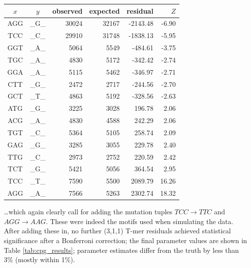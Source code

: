 \documentclass{article}
\newcommand{\nA}{\mbox{A}}  %
\newcommand{\nC}{\mbox{C}}
\newcommand{\nG}{\mbox{G}}
\newcommand{\nT}{\mbox{T}}
\theoremstyle{plain}
\theoremstyle{definition}
\begin{document}
    \begin{center}
        \begin{tabular}{ccrrrr}
            \hline
                $x$ & $y$ & observed &   expected &    residual &  $Z$ \\
                \hline
                \nA\nG\nG  &  \_\nG\_  &  30024  &  32167  &  -2143.48  &  -6.90 \\
                \nT\nC\nC  &  \_\nC\_  &  29910  &  31748  &  -1838.13  &  -5.95 \\
                \nG\nG\nT  &  \_\nA\_  &   5064  &   5549  &   -484.61  &  -3.75 \\
                \nT\nG\nC  &  \_\nA\_  &   4830  &   5172  &   -342.42  &  -2.74 \\
                \nG\nG\nA  &  \_\nA\_  &   5115  &   5462  &   -346.97  &  -2.71 \\
                \nC\nT\nT  &  \_\nG\_  &   2472  &   2717  &   -244.56  &  -2.70 \\
                \nG\nC\nT  &  \_\nT\_  &   4863  &   5192  &   -328.56  &  -2.63 \\
                \hline
                \nA\nT\nG  &  \_\nG\_  &   3225  &   3028  &    196.78  &   2.06  \\
                \nA\nC\nG  &  \_\nA\_  &   4830  &   4588  &    242.29  &   2.06  \\
                \nT\nG\nT  &  \_\nC\_  &   5364  &   5105  &    258.74  &   2.09  \\
                \nG\nA\nG  &  \_\nG\_  &   3285  &   3055  &    229.78  &   2.40  \\
                \nT\nT\nG  &  \_\nC\_  &   2973  &   2752  &    220.59  &   2.42  \\
                \nT\nC\nT  &  \_\nG\_  &   5421  &   5056  &    364.54  &   2.95  \\
                \nT\nC\nC  &  \_\nT\_  &   7590  &   5500  &   2089.79  &  16.26  \\
                \nA\nG\nG  &  \_\nA\_  &   7566  &   5263  &   2302.74  &  18.32  \\
                \hline
        \end{tabular}
    \end{center}
\ldots which again clearly call for adding the mutation tuples $TCC \to TTC$ and $AGG \to AAG$.
These were indeed the motifs used when simulating the data.
After adding these in,
no further (3,1,1) T-mer residuals achieved
statistical significance after a Bonferroni correction;
the final parameter values are shown in Table \ref{tab:cpg_results};
parameter estimates differ from the truth by less than 3\% (mostly within 1\%).
\end{document}
